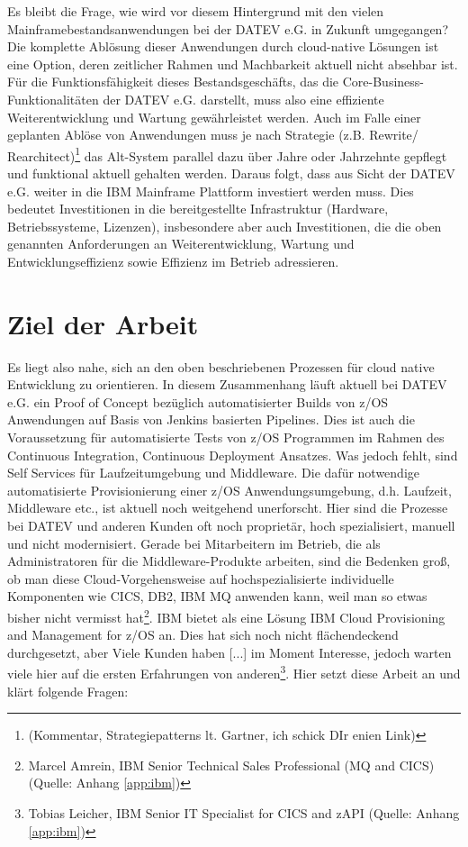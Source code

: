 Es bleibt die Frage, wie wird vor diesem Hintergrund mit den vielen Mainframebestandsanwendungen bei der DATEV e.G. in Zukunft umgegangen?
Die komplette Ablösung dieser Anwendungen durch cloud-native Lösungen ist eine Option, deren zeitlicher Rahmen und Machbarkeit aktuell nicht absehbar ist.
Für die Funktionsfähigkeit dieses Bestandsgeschäfts, das die Core-Business-Funktionalitäten der DATEV e.G. darstellt, muss also eine effiziente Weiterentwicklung und Wartung gewährleistet werden.
Auch im Falle einer geplanten Ablöse von Anwendungen muss je nach Strategie (z.B. \glqq Rewrite\grqq / \glqq Rearchitect\grqq)\footnote{(Kommentar, Strategiepatterns lt. Gartner, ich schick DIr enien Link)} das Alt-System parallel dazu über Jahre oder Jahrzehnte gepflegt und funktional aktuell gehalten werden.
Daraus folgt, dass aus Sicht der DATEV e.G. weiter in die IBM Mainframe Plattform investiert werden muss. 
Dies bedeutet Investitionen in die bereitgestellte Infrastruktur (Hardware, Betriebssysteme, Lizenzen), insbesondere aber auch Investitionen, die die oben genannten Anforderungen an Weiterentwicklung, Wartung und Entwicklungseffizienz sowie Effizienz im Betrieb adressieren.

\section{Ziel der Arbeit}\label{sec:ziel}
Es liegt also nahe, sich an den oben beschriebenen Prozessen für cloud native Entwicklung zu orientieren. 
In diesem Zusammenhang läuft aktuell  bei DATEV e.G. ein Proof of Concept bezüglich automatisierter Builds von z/OS Anwendungen auf Basis von Jenkins basierten Pipelines. 
Dies ist auch die Voraussetzung für automatisierte Tests von z/OS Programmen im Rahmen des \glqq Continuous Integration, Continuous Deployment\grqq{} Ansatzes.
Was jedoch fehlt, sind \glqq Self Services\grqq{} für  Laufzeitumgebung und  Middleware.
Die dafür notwendige automatisierte Provisionierung einer z/OS Anwendungsumgebung, d.h. Laufzeit, Middleware etc., ist aktuell noch weitgehend unerforscht. 
Hier sind die Prozesse bei DATEV und anderen Kunden oft noch proprietär, hoch spezialisiert,  manuell und nicht modernisiert. 
Gerade bei Mitarbeitern im Betrieb, die als Administratoren für die Middleware-Produkte arbeiten, sind die Bedenken groß, ob man diese Cloud-Vorgehensweise auf hochspezialisierte individuelle Komponenten wie CICS, DB2, IBM MQ anwenden kann, \glqq weil man so etwas bisher nicht vermisst hat\grqq\footnote{Marcel Amrein, IBM Senior Technical Sales Professional (MQ and CICS) (Quelle: Anhang \ref{app:ibm})}.
IBM bietet als eine Lösung \glqq IBM Cloud Provisioning and Management for z/OS\grqq{} an. 
Dies hat sich noch nicht flächendeckend durchgesetzt, aber \glqq Viele Kunden haben [...] im Moment Interesse, jedoch warten viele hier auf die ersten Erfahrungen von anderen\grqq\footnote{Tobias Leicher, IBM Senior IT Specialist for CICS and zAPI (Quelle: Anhang \ref{app:ibm})}.
Hier setzt diese Arbeit an und klärt folgende Fragen:

